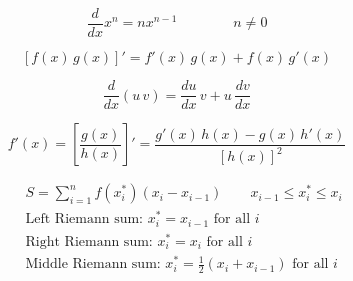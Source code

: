 \[\begin{equation} \frac{d}{dx} x^n = n x^{n-1} \qquad\qquad n \neq 0 \end{equation}\]

\[\begin{equation} \left[ f(x) \, g(x) \right]'=f'(x) \, g(x) + f(x) \, g'(x) \end{equation}\]

\[\begin{equation} \dfrac{d}{dx}(u \, v) = \dfrac{du}{dx} \, v + u \, \dfrac{dv}{dx} \end{equation}\]

\[\begin{equation} f'(x) = \left[ \frac{g(x)}{h(x)} \right]' = \frac{g'(x) \, h(x) - g(x) \, h'(x)}{[h(x)]^2} \end{equation}\]

\[\begin{align} &S = \sum_{i=1}^{n} f(x_i^*)(x_{i} - x_{i-1}) \qquad x_{i-1}\le x_i^* \le x_i \\\ &\text{Left Riemann sum: } x_i^* = x_{i-1} \text{ for all } i \\\ &\text{Right Riemann sum: } x_i^* = x_{i} \text{ for all } i \\\ &\text{Middle Riemann sum: } x_i^* = \frac{1}{2} \left( x_i + x_{i-1} \right) \text{ for all } i \end{align}\]

